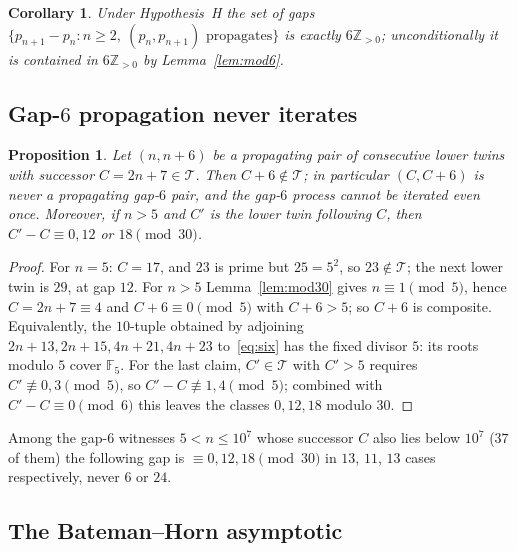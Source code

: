 \documentclass[11pt,a4paper]{article}
\newtheorem{proposition}[theorem]{Proposition}
\newtheorem{corollary}[theorem]{Corollary}
\theoremstyle{definition}
\theoremstyle{remark}
\newcommand{\T}{\mathcal{T}}
\newcommand{\F}{\mathbb{F}}
\newcommand{\Z}{\mathbb{Z}}
\begin{document}
\begin{corollary}
Under Hypothesis~H the set of gaps $\{p_{n+1}-p_n : n\ge 2,\ (p_n,p_{n+1}) \text{ propagates}\}$ is exactly $6\Z_{>0}$; unconditionally it is contained in $6\Z_{>0}$ by Lemma~\ref{lem:mod6}.
\end{corollary}

\subsection{Gap-\texorpdfstring{$6$}{6} propagation never iterates}

\begin{proposition}\label{prop:noiterate}
Let $(n,n+6)$ be a propagating pair of consecutive lower twins with successor $C = 2n+7\in\T$.
Then $C+6\notin\T$; in particular $(C, C+6)$ is never a propagating gap-$6$ pair, and the gap-$6$ process cannot be iterated even once.
Moreover, if $n>5$ and $C'$ is the lower twin following $C$, then $C'-C\equiv 0, 12$ or $18\pmod{30}$.
\end{proposition}

\begin{proof}
For $n = 5$: $C = 17$, and $23$ is prime but $25 = 5^2$, so $23\notin\T$; the next lower twin is $29$, at gap $12$.
For $n>5$ Lemma~\ref{lem:mod30} gives $n\equiv 1\pmod 5$, hence $C = 2n+7\equiv 4$ and $C+6\equiv 0\pmod 5$ with $C+6>5$; so $C+6$ is composite.
Equivalently, the $10$-tuple obtained by adjoining $2n+13, 2n+15, 4n+21, 4n+23$ to~\eqref{eq:six} has the fixed divisor $5$: its roots modulo $5$ cover $\F_5$.
For the last claim, $C'\in\T$ with $C'>5$ requires $C'\not\equiv 0,3\pmod 5$, so $C'-C\not\equiv 1,4\pmod 5$; combined with $C'-C\equiv 0\pmod 6$ this leaves the classes $0,12,18$ modulo $30$.
\end{proof}

Among the gap-$6$ witnesses $5<n\le 10^7$ whose successor $C$ also lies below $10^7$ ($37$ of them) the following gap is $\equiv 0, 12, 18\pmod{30}$ in $13$, $11$, $13$ cases respectively, never $6$ or $24$.

\subsection{The Bateman--Horn asymptotic}
\end{document}
